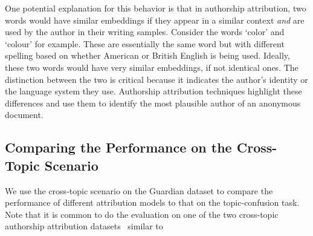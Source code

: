 \documentclass[11pt]{article}
\begin{document}
One potential explanation for this behavior is that in authorship attribution, two words would have similar embeddings if they appear in a similar context \textit{and} are used by the author in their writing samples. Consider the words `color' and `colour' for example. These are essentially the same word but with different spelling based on whether American or British English is being used. Ideally, these two words would have very similar embeddings, if not identical ones. The distinction between the two is critical because it indicates the author's identity or the language system they use. Authorship attribution techniques highlight these differences and use them to identify the most plausible author of an anonymous document. 

\subsection{Comparing the Performance on the Cross-Topic Scenario}
We use the cross-topic scenario on the Guardian dataset to compare the performance of different attribution models to that on the topic-confusion task. Note that it is common to do the evaluation on one of the two cross-topic authorship attribution datasets~\citep{goldstein2009person,Stamatatos.E:2013} similar to~ \citep{goldstein2009person,Sapkota.U:2014,Stamatatos.E:2017, stamatatos2018masking,Barlas2020,Barlas2021}



\end{document}
